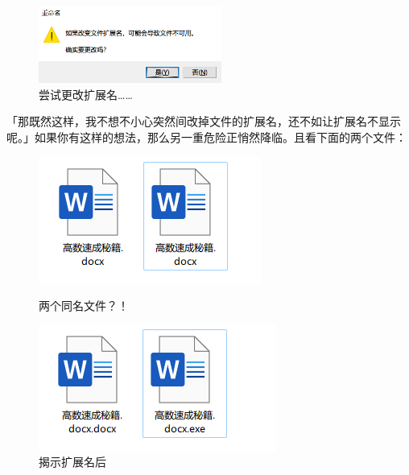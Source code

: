 \begin{figure}[htb!]
  \centering
  \includegraphics[width=6cm]{assets/basic/Warning_when_changing_extension.png}
  \caption{尝试更改扩展名……}
  \label{fig:Warning_when_changing_extension}
\end{figure}

「那既然这样，我不想不小心突然间改掉文件的扩展名，还不如让扩展名不显示呢。」如果你有这样的想法，那么另一重危险正悄然降临。且看下面的两个文件：

\begin{figure}[htb!]
  \centering
  \begin{minipage}{.48\textwidth}
    \centering
    \includegraphics[width=.95\textwidth]{assets/basic/fake_doc.png}
    \caption{两个同名文件？！}
    \label{fig:fake_doc}
  \end{minipage}
  \begin{minipage}{.48\textwidth}
    \centering
    \includegraphics[width=.95\textwidth]{assets/basic/fake_doc_revealed.png}
    \caption{揭示扩展名后}
    \label{fig:fake_doc_revealed}
  \end{minipage}
\end{figure}

